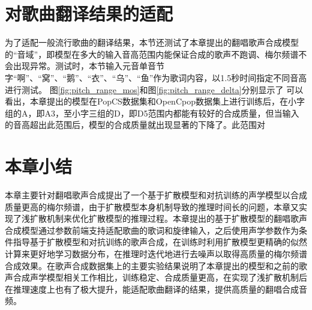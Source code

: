\section{对歌曲翻译结果的适配}
为了适配一般流行歌曲的翻译结果，本节还测试了本章提出的翻唱歌声合成模型的``音域''，即模型在多大的输入音高范围内能保证合成的歌声不跑调、梅尔频谱不会出现异常。测试时，本节输入元音单音节字``啊''、``窝''、``鹅''、``衣''、``乌''、``鱼''作为歌词内容，以1.5秒时间指定不同音高进行测试。
图\ref{fig:pitch_range_mos}和图\ref{fig:pitch_range_delta}分别显示了
可以看出，本章提出的模型在PopCS数据集和OpenCpop数据集上进行训练后，在小字组的A，即A3，至小字三组的D，即D5范围内都能有较好的合成质量，但当输入的音高超出此范围后，模型的合成质量就出现显著的下降了。此范围对
\section{本章小结}
本章主要针对翻唱歌声合成提出了一个基于扩散模型和对抗训练的声学模型以合成质量更高的梅尔频谱，由于扩散模型本身机制导致的推理时间长的问题，本章又实现了浅扩散机制\citep{diffsinger}来优化扩散模型的推理过程。本章提出的基于扩散模型的翻唱歌声合成模型通过参数前端支持适配歌曲的歌词和旋律输入，之后使用声学参数作为条件指导基于扩散模型和对抗训练的歌声合成，在训练时利用扩散模型更精确的似然计算来更好地学习数据分布，在推理时迭代地进行去噪声以取得高质量的梅尔频谱合成效果。在歌声合成数据集上的主要实验结果说明了本章提出的模型和之前的歌声合成声学模型相关工作相比，训练稳定、合成质量更高，在实现了浅扩散机制后在推理速度上也有了极大提升，能适配歌曲翻译的结果，提供高质量的翻唱合成音频。
